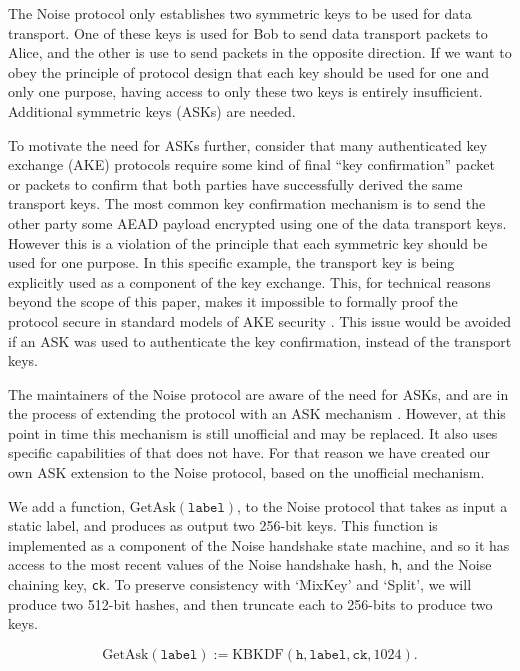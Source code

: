 \documentclass{article}
\begin{document}
The Noise protocol only establishes two symmetric keys to be used for data transport. One of these keys is used for Bob to send data transport packets to Alice, and the other is use to send packets in the opposite direction. If we want to obey the principle of protocol design that each key should be used for one and only one purpose, having access to only these two keys is entirely insufficient. Additional symmetric keys (ASKs) are needed.

To motivate the need for ASKs further, consider that many authenticated key exchange (AKE) protocols require some kind of final ``key confirmation'' packet or packets to confirm that both parties have successfully derived the same transport keys. The most common key confirmation mechanism is to send the other party some AEAD payload encrypted using one of the data transport keys. However this is a violation of the principle that each symmetric key should be used for one purpose. In this specific example, the transport key is being explicitly used as a component of the key exchange. This, for technical reasons beyond the scope of this paper, makes it impossible to formally proof the protocol secure in standard models of AKE security \cite{wireguard_analysis}. This issue would be avoided if an ASK was used to authenticate the key confirmation, instead of the transport keys.

The maintainers of the Noise protocol are aware of the need for ASKs, and are in the process of extending the protocol with an ASK mechanism \cite{noise_ask}. However, at this point in time this mechanism is still unofficial and may be replaced. It also uses specific capabilities of  that  does not have. For that reason we have created our own ASK extension to the Noise protocol, based on the unofficial mechanism.

We add a function, $\text{GetAsk}(\texttt{label})$, to the Noise protocol that takes as input a static label, and produces as output two 256-bit keys. This function is implemented as a component of the Noise handshake state machine, and so it has access to the most recent values of the Noise handshake hash, \texttt{h}, and the Noise chaining key, \texttt{ck}. To preserve consistency with `MixKey' and `Split', we will produce two 512-bit hashes, and then truncate each to 256-bits to produce two keys.

$$\text{GetAsk}(\texttt{label}) := \text{KBKDF}(\texttt{h}, \texttt{label}, \texttt{ck}, 1024).$$
\end{document}
